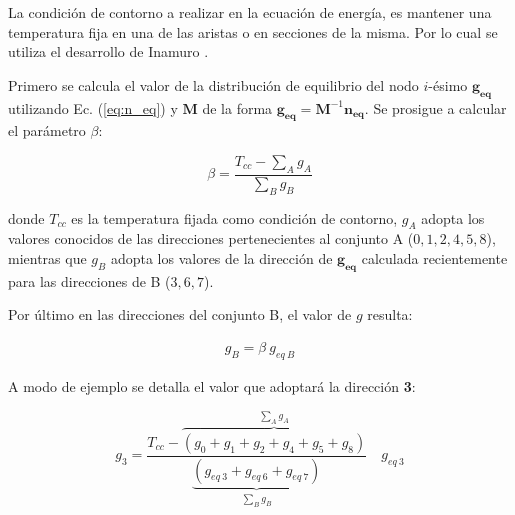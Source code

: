 La condición de contorno a realizar en la ecuación de energía, es mantener una temperatura fija en una de las aristas o en secciones de la misma. Por lo cual se utiliza el desarrollo de Inamuro \cite{inamuro2002lattice}.

Primero se calcula el valor de la distribución de equilibrio del nodo $i$-ésimo $\mathbf{g_{eq}}$ utilizando Ec. (\ref{eq:n_eq}) y $\mathbf{M}$ de la forma $\mathbf{g_{eq}} = \mathbf{M}^{-1} \mathbf{n_{eq}}$. Se prosigue a calcular el parámetro $\beta$:

\begin{equation}
\beta = \frac{T_{cc} - \sum_{A} g_{A}}{\sum_{B} g_{B}}
\label{eq:beta}
\end{equation}

donde $T_{cc}$ es la temperatura fijada como condición de contorno, $g_{A}$ adopta los valores conocidos de las direcciones pertenecientes al conjunto A ($0, 1, 2, 4, 5, 8 $), mientras que $g_{B}$ adopta los valores de la dirección de $\mathbf{g_{eq}}$ calculada recientemente para las direcciones de B ($3, 6, 7$).

Por último en las direcciones del conjunto B, el valor de $g$ resulta:

\begin{align}
	g_{B} = \beta \> g_{eq \> B} 
\end{align}

A modo de ejemplo se detalla el valor que adoptará la dirección \textbf{3}:

\begin{equation}
	g_{3} = \frac{T_{cc} - \overbrace{\left( g_{0} + g_{1} +g_{2} + g_{4} + g_{5} + g_{8} \right)}^{\sum_{A} g_{A}} }{\underbrace{\left( g_{eq\>3} + g_{eq\>6} + g_{eq\>7} \right)}_{\sum_{B} g_{B} }} \quad g_{eq\>3}
\end{equation}


